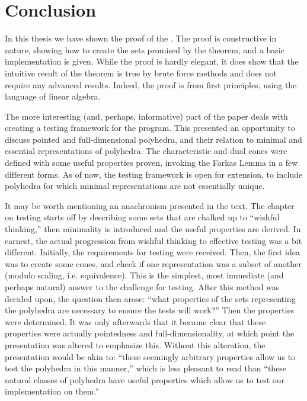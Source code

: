 \chapter*{Conclusion}

In this thesis we have shown the proof of the \MWT.  The proof is constructive in nature, showing how to create the sets promised by the theorem, and a basic implementation is given.  While the proof is hardly elegant, it does show that the intuitive result of the theorem is true by brute force methods and does not require any advanced results.  Indeed, the proof is from first principles, using the language of linear algebra.

The more interesting (and, perhaps, informative) part of the paper deals with creating a testing framework for the program.  This presented an opportunity to discuss pointed and full-dimensional polyhedra, and their relation to minimal and essential representations of polyhedra.  The characteristic and dual cones were defined with some useful properties proven, invoking the Farkas Lemma in a few different forms.  As of now, the testing framework is open for extension, to include polyhedra for which minimal representations are not essentially unique.

It may be worth mentioning an anachronism presented in the text.  The chapter on testing starts off by describing some sets that are chalked up to ``wishful thinking,'' then minimality is introduced and the useful properties are derived.  In earnest, the actual progression from wishful thinking to effective testing was a bit different.  Initially, the requirements for testing were received.  Then, the first idea was to create some cones, and check if one representation was a subset of another (modulo scaling, i.e. equivalence).  This is the simplest, most immediate (and perhaps natural) answer to the challenge for testing.  After this method was decided upon, the question then arose: ``what properties of the sets representing the polyhedra are necessary to ensure the tests will work?''  Then the properties were determined.  It was only afterwards that it became clear that these properties were actually pointedness and full-dimensionality, at which point the presentation was altered to emphasize this.  Without this alteration, the presentation would be akin to: ``these seemingly arbitrary properties allow us to test the polyhedra in this manner,'' which is less pleasant to read than ``these natural classes of polyhedra have useful properties which allow us to test our implementation on them.''

